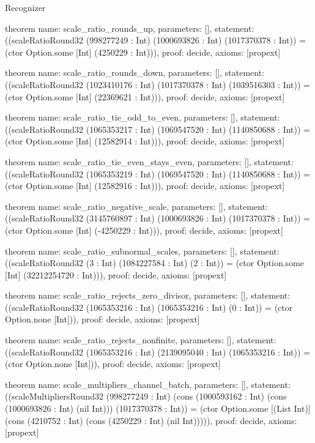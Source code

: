\begin{lexlean}{Recognizer}
\begin{semanticmodule}
theorem{
  name: scale_ratio_rounds_up,
  parameters: [],
  statement: ((scaleRatioRound32 (998277249 : Int) (1000693826 : Int) (1017370378 : Int)) = (ctor Option.some [Int] (4250229 : Int))),
  proof: decide{},
  axioms: [propext]
}

theorem{
  name: scale_ratio_rounds_down,
  parameters: [],
  statement: ((scaleRatioRound32 (1023410176 : Int) (1017370378 : Int) (1039516303 : Int)) = (ctor Option.some [Int] (22369621 : Int))),
  proof: decide{},
  axioms: [propext]
}

theorem{
  name: scale_ratio_tie_odd_to_even,
  parameters: [],
  statement: ((scaleRatioRound32 (1065353217 : Int) (1069547520 : Int) (1140850688 : Int)) = (ctor Option.some [Int] (12582914 : Int))),
  proof: decide{},
  axioms: [propext]
}

theorem{
  name: scale_ratio_tie_even_stays_even,
  parameters: [],
  statement: ((scaleRatioRound32 (1065353219 : Int) (1069547520 : Int) (1140850688 : Int)) = (ctor Option.some [Int] (12582916 : Int))),
  proof: decide{},
  axioms: [propext]
}

theorem{
  name: scale_ratio_negative_scale,
  parameters: [],
  statement: ((scaleRatioRound32 (3145760897 : Int) (1000693826 : Int) (1017370378 : Int)) = (ctor Option.some [Int] (-4250229 : Int))),
  proof: decide{},
  axioms: [propext]
}

theorem{
  name: scale_ratio_subnormal_scales,
  parameters: [],
  statement: ((scaleRatioRound32 (3 : Int) (1084227584 : Int) (2 : Int)) = (ctor Option.some [Int] (32212254720 : Int))),
  proof: decide{},
  axioms: [propext]
}

theorem{
  name: scale_ratio_rejects_zero_divisor,
  parameters: [],
  statement: ((scaleRatioRound32 (1065353216 : Int) (1065353216 : Int) (0 : Int)) = (ctor Option.none [Int])),
  proof: decide{},
  axioms: [propext]
}

theorem{
  name: scale_ratio_rejects_nonfinite,
  parameters: [],
  statement: ((scaleRatioRound32 (1065353216 : Int) (2139095040 : Int) (1065353216 : Int)) = (ctor Option.none [Int])),
  proof: decide{},
  axioms: [propext]
}

theorem{
  name: scale_multipliers_channel_batch,
  parameters: [],
  statement: ((scaleMultipliersRound32 (998277249 : Int) (cons (1000593162 : Int) (cons (1000693826 : Int) (nil Int))) (1017370378 : Int)) = (ctor Option.some [(List Int)] (cons (4210752 : Int) (cons (4250229 : Int) (nil Int))))),
  proof: decide{},
  axioms: [propext]
}
\end{semanticmodule}
\end{lexlean}
